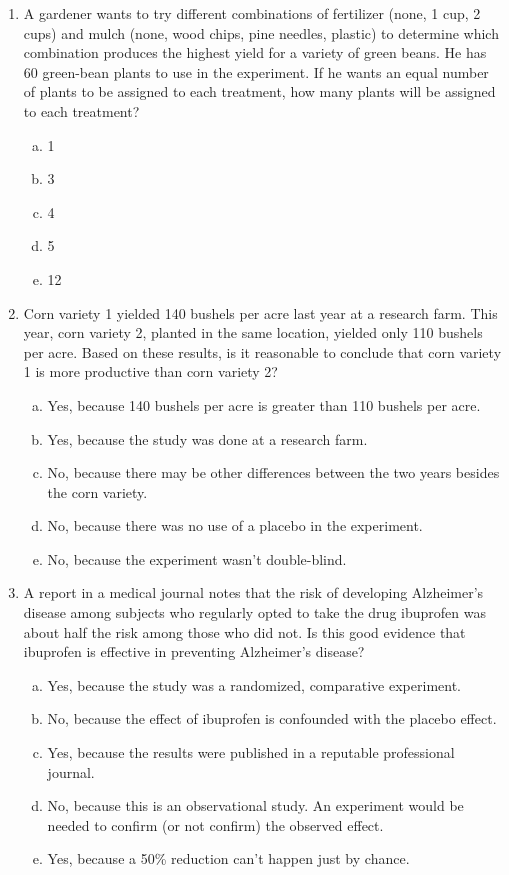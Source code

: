 \documentclass[a4paper,12pt,twoside]{book}
\begin{document}
\begin{enumerate}
    \item A gardener wants to try different combinations of fertilizer (none, 1 cup, 2 cups) and mulch (none, wood chips, pine needles, plastic) to determine which combination produces the highest yield for a variety of green beans. He has 60 green-bean plants to use in the experiment. If he wants an equal number of plants to be assigned to each treatment, how many plants will be assigned to each treatment?
       \begin{multicols}{5}
       \begin{enumerate}[(a), start = 1]
           \item 1
           \item 3
           \item 4
           \item 5
           \item 12
       \end{enumerate}
       \end{multicols}

\item  Corn variety 1 yielded 140 bushels per acre last year at a research farm. This year, corn variety 2, planted in the same location, yielded only 110 bushels per acre. Based on these results, is it reasonable to conclude that corn variety 1 is more productive than corn variety 2?
    \begin{enumerate}[(a)]
        \item Yes, because 140 bushels per acre is greater than 110 bushels per acre.  
        \item Yes, because the study was done at a research farm.
        \item No, because there may be other differences between the two years besides the corn variety.
        \item  No, because there was no use of a placebo in the experiment.
        \item No, because the experiment wasn’t double-blind.
    \end{enumerate}        
 
 \item A report in a medical journal notes that the risk of developing Alzheimer’s disease among subjects who regularly opted to take the drug ibuprofen was about half the risk among those who did not. Is this good evidence that ibuprofen is effective in preventing Alzheimer’s disease?
    \begin{enumerate}[(a)]
        \item Yes, because the study was a randomized, comparative experiment.
        \item No, because the effect of ibuprofen is confounded with the placebo effect.
        \item Yes, because the results were published in a reputable professional journal.
        \item No, because this is an observational study. An experiment would be needed to confirm (or not confirm) the observed effect.
        \item Yes, because a 50\% reduction can’t happen just by chance.
    \end{enumerate}       
 

\end{enumerate}
\end{document}
